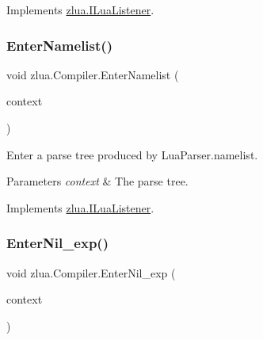Implements \mbox{\hyperlink{interfacezlua_1_1_i_lua_listener_a55b4f82ec10a24203046b5f3e9cadfe6}{zlua.\+I\+Lua\+Listener}}.

\mbox{\label{classzlua_1_1_compiler_a2a5054c21e462c7c373154ea435db694}} 
\subsubsection{\texorpdfstring{Enter\+Namelist()}{EnterNamelist()}}
{\footnotesize\ttfamily void zlua.\+Compiler.\+Enter\+Namelist (\begin{DoxyParamCaption}\item[{\mbox{[}\+Not\+Null\mbox{]} \mbox{\hyperlink{classzlua_1_1_lua_parser_1_1_namelist_context}{Lua\+Parser.\+Namelist\+Context}}}]{context }\end{DoxyParamCaption})}



Enter a parse tree produced by Lua\+Parser.\+namelist. 


\begin{DoxyParams}{Parameters}
{\em context} & The parse tree.\\
\hline
\end{DoxyParams}


Implements \mbox{\hyperlink{interfacezlua_1_1_i_lua_listener_ad550fd673f32ad3d88572e1781551e41}{zlua.\+I\+Lua\+Listener}}.

\mbox{\label{classzlua_1_1_compiler_a311aa04e7e5d26fae07d698a436dab6d}} 
\subsubsection{\texorpdfstring{Enter\+Nil\+\_\+exp()}{EnterNil\_exp()}}
{\footnotesize\ttfamily void zlua.\+Compiler.\+Enter\+Nil\+\_\+exp (\begin{DoxyParamCaption}\item[{\mbox{[}\+Not\+Null\mbox{]} \mbox{\hyperlink{classzlua_1_1_lua_parser_1_1_nil__exp_context}{Lua\+Parser.\+Nil\+\_\+exp\+Context}}}]{context }\end{DoxyParamCaption})}



